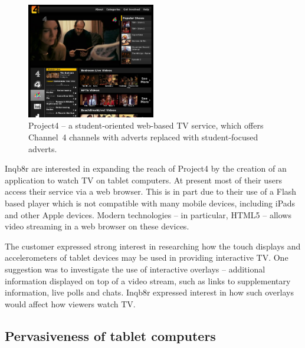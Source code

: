 	\begin{figure}[htb]
		\centering
			\includegraphics[width=0.5\textwidth]{images/project4.png}
		\caption{Project4 -- a student-oriented web-based TV service, which offers Channel~4 channels with adverts replaced with student-focused adverts.}
		\label{fig:project4}
	\end{figure}

	Inqb8r are interested in expanding the reach of Project4 by the creation of an application to watch TV on tablet computers. At present most of their users access their service via a web browser. This is in part due to their use of a Flash based player which is not compatible with many mobile devices, including iPads and other Apple devices. Modern technologies -- in particular, HTML5 -- allows video streaming in a web browser on these devices.

	The customer expressed strong interest in researching how the touch displays and accelerometers of tablet devices may be used in providing interactive TV. One suggestion was to investigate the use of interactive overlays -- additional information displayed on top of a video stream, such as links to supplementary information, live polls and chats. Inqb8r expressed interest in how such overlays would affect how viewers watch TV.
	

\subsection{Pervasiveness of tablet computers}

